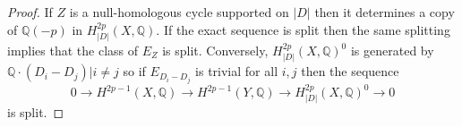 \documentclass[10pt,a4paper]{amsart}
\newcommand {\Q}{{\mathds Q}}
\begin{document}
	\begin{proof} If $Z$ is a null-homologous cycle supported on $|D|$ then it determines a copy of $\Q(-p)$ in $H^{2p}_{|D|}(X,\Q)$. If the exact sequence is split then the same splitting implies that the class of $E_Z$ is split. Conversely, $H^{2p}_{|D|}(X,\Q)^0$ is generated by $\Q\cdot (D_i-D_j)|i \neq j$ so if $E_{D_i-D_j}$ is trivial for all $i,j$ then the sequence 
			$$0 \rightarrow H^{2p-1}(X,\Q) \rightarrow  H^{2p-1}(Y,\Q) \rightarrow H^{2p}_{|D|}(X,\Q)^0 \rightarrow 0$$
		is split. 
		\end{proof}
\end{document}
